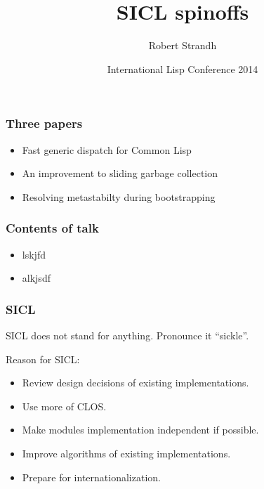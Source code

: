 \documentclass{beamer}
\title{SICL spinoffs}
\author{Robert Strandh\inst{1}}
\institute{\inst{1}Université de Bordeaux}
\date[ILC 2014]{International Lisp Conference 2014}
\begin{document}
\begin{frame}
  \titlepage
\end{frame}
\begin{frame}
\frametitle{Three papers}

\begin{itemize}
\item Fast generic dispatch for Common Lisp
\item An improvement to sliding garbage collection
\item Resolving metastabilty during bootstrapping
\end{itemize}

\end{frame}
\begin{frame}
\frametitle{Contents of talk}

\begin{itemize}
\item lskjfd
\item alkjsdf 
\end{itemize}
\end{frame}
\begin{frame}
\frametitle{SICL}

SICL does not stand for anything.  Pronounce it ``sickle''.

Reason for SICL:

\begin{itemize}
\item Review design decisions of existing implementations.
\item Use more of CLOS.
\item Make modules implementation independent if possible.
\item Improve algorithms of existing implementations. 
\item Prepare for internationalization. 
\end{itemize}
\end{frame}
\end{document}
